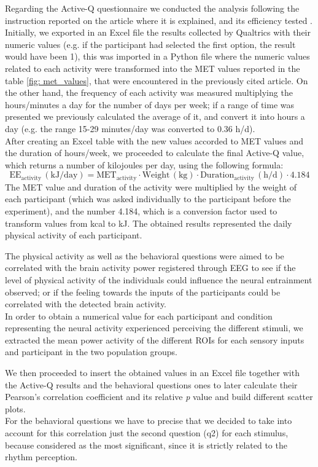 Regarding the Active-Q questionnaire we conducted the analysis following the instruction reported on the article where it is explained, and its efficiency tested \parencite{Bonn_2012}. Initially, we exported in an Excel file the results collected by Qualtrics with their numeric values (e.g. if the participant had selected the first option, the result would have been 1), this was imported in a Python file where the numeric values related to each activity were transformed into the MET values reported in the table \ref{fig: met_values}, that were encountered in the previously cited article. On the other hand, the frequency of each activity was measured multiplying the hours/minutes a day for the number of days per week; if a range of time was presented we previously calculated the average of it, and convert it into hours a day (e.g. the range 15-29 minutes/day was converted to 0.36 h/d).  \\
After creating an Excel table with the new values accorded to MET values and the duration of hours/week, we proceeded to calculate the final Active-Q value, which returns a number of kilojoules per day, using the following formula: 
\[
\text{EE}_{\text{activity}} \, (\text{kJ/day}) = \text{MET}_{\text{activity}} \cdot \text{Weight} \, (\text{kg}) \cdot \text{Duration}_{\text{activity}} \, (\text{h/d}) \cdot 4.184
\]
The MET value and duration of the activity were multiplied by the weight of each participant (which was asked individually to the participant before the experiment), and the number 4.184, which is a conversion factor used to transform values from kcal to kJ. The obtained results represented the daily physical activity of each participant. 

The physical activity as well as the behavioral questions were aimed to be correlated with the brain activity power registered through EEG to see if the level of physical activity of the individuals could influence the neural entrainment observed; or if the feeling towards the inputs of the participants could be correlated with the detected brain activity. \\ 
In order to obtain a numerical value for each participant and condition representing the neural activity experienced perceiving the different stimuli, we extracted the mean power activity of the different ROIs for each sensory inputs and participant in the two population groups. 

We then proceeded to insert the obtained values in an Excel file together with the Active-Q results and the behavioral questions ones to later calculate their Pearson's correlation coefficient and its relative \textit{p} value and build different scatter plots. \\
For the behavioral questions we have to precise that we decided to take into account for this correlation just the second question (q2) for each stimulus, because considered as the most significant, since it is strictly related to the rhythm perception.